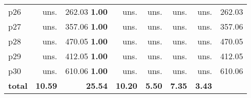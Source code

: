 \begin{tabular}{|l|rrrrrr|r|}
p26 & uns. & {\footnotesize 262.03} \textbf{1.00} & uns. & uns. & uns. & uns. & 262.03\\
p27 & uns. & {\footnotesize 357.06} \textbf{1.00} & uns. & uns. & uns. & uns. & 357.06\\
p28 & uns. & {\footnotesize 470.05} \textbf{1.00} & uns. & uns. & uns. & uns. & 470.05\\
p29 & uns. & {\footnotesize 412.05} \textbf{1.00} & uns. & uns. & uns. & uns. & 412.05\\
p30 & uns. & {\footnotesize 610.06} \textbf{1.00} & uns. & uns. & uns. & uns. & 610.06\\
\hline
\textbf{total} & \textbf{10.59} & \textbf{25.54} & \textbf{10.20} & \textbf{5.50} & \textbf{7.35} & \textbf{3.43} & \\
\hline
\end{tabular}

